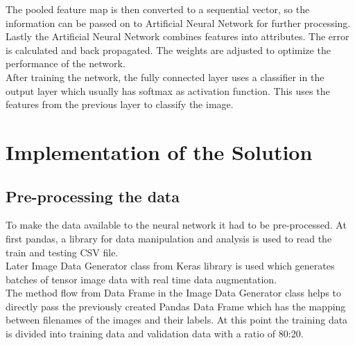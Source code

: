\documentclass[10pt,twocolumn,letterpaper]{article}
\begin{document}
The pooled feature map is then converted to a sequential vector, so the information can be passed on to Artificial Neural Network for further processing. \\
Lastly the Artificial Neural Network combines features into attributes. The error is calculated and back propagated. The weights are adjusted to optimize the performance of the network. \\
After training the network, the fully connected layer uses a classifier in the output layer which usually has softmax as activation function. This uses the features from the previous layer to classify the image. \cite{tds}

\section{Implementation of the Solution}
\subsection{Pre-processing the data}
To make the data available to the neural network it had to be pre-processed. At first pandas, a library for data manipulation and analysis is used to read the train and testing CSV file.\\
Later Image Data Generator class from Keras library is used which generates batches of tensor image data with real time data augmentation.\\
The method flow from Data Frame in the Image Data Generator class helps to directly pass the previously created Pandas Data Frame which has the mapping between filenames of the images and their labels. At this point the training data is divided into training data and validation data with a ratio of 80:20. 

\end{document}
